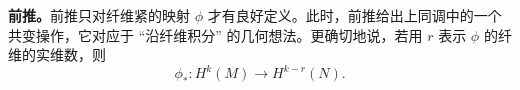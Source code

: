 
\textbf{前推。}前推只对纤维紧的映射 $\phi$ 才有良好定义。此时，前推给出上同调中的一个共变操作，它对应于 “沿纤维积分” 的几何想法。更确切地说，若用 $r$ 表示 $\phi$ 的纤维的实维数，则
\begin{equation}
  \phi_*\colon H^k(M)\longrightarrow H^{k-r}(N).
  \tag{2.35}
\end{equation}

